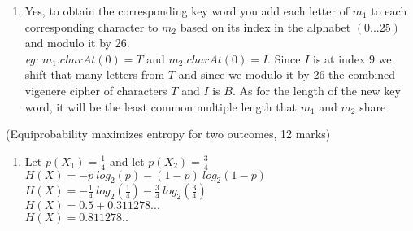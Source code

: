 \documentclass{assignment}
\begin{document}
\begin{problemlist}
\begin{problem}
\begin{answer}
\begin{enumerate}[label=(\alph*)]
\begin{enumerate}[label=(\roman*)]
			\item Yes, to obtain the corresponding key word you add each letter of $m_1$ to each corresponding character to $m_2$ based on its index in the alphabet $(0 ... 25) $ and modulo it by 26. \\
			\textit{eg:} $m_1.charAt(0) = T$ and $m_2.charAt(0) = I$. Since $I$ is at index $9$ we shift that many letters from $T$ and since we modulo it by 26 the combined vigenere cipher of characters $T$ and $I$ is $B$.
			As for the length of the new key word, it will be the least common multiple length that $m_1$ and $m_2$ share
			\end{enumerate}
\end{enumerate}
\end{answer}
\end{problem}

\clearpage

\pbitem (Equiprobability maximizes entropy for two outcomes, 12 marks)
\begin{problem}
\begin{answer}
\begin{enumerate}[label=(\alph*)]
	\item	Let $ p(X_1) = \frac{1}{4} $ and let $ p(X_2) = \frac{3}{4} $	\\
			$H(X) = -p \ log_2(p) -(1-p) \ log_2(1-p) $ \\
			$H(X) = -\frac{1}{4} \ log_2(\frac{1}{4}) -\frac{3}{4} \ log_2(\frac{3}{4}) $ \\
			$H(X) = 0.5 + 0.311278...$ \\
			$H(X) = 0.811278.. $
			

\end{enumerate}
\end{answer}
\end{problem}
\end{problemlist}
\end{document}
